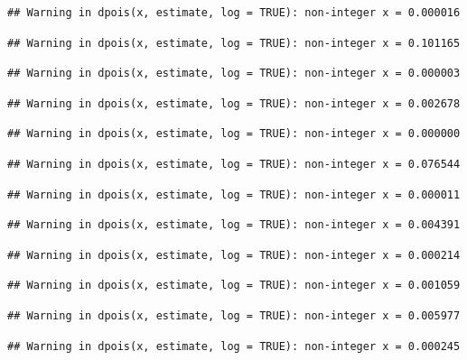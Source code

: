 \documentclass[]{article}
\begin{document}
\begin{verbatim}
## Warning in dpois(x, estimate, log = TRUE): non-integer x = 0.000016
\end{verbatim}

\begin{verbatim}
## Warning in dpois(x, estimate, log = TRUE): non-integer x = 0.101165
\end{verbatim}

\begin{verbatim}
## Warning in dpois(x, estimate, log = TRUE): non-integer x = 0.000003
\end{verbatim}

\begin{verbatim}
## Warning in dpois(x, estimate, log = TRUE): non-integer x = 0.002678
\end{verbatim}

\begin{verbatim}
## Warning in dpois(x, estimate, log = TRUE): non-integer x = 0.000000
\end{verbatim}

\begin{verbatim}
## Warning in dpois(x, estimate, log = TRUE): non-integer x = 0.076544
\end{verbatim}

\begin{verbatim}
## Warning in dpois(x, estimate, log = TRUE): non-integer x = 0.000011
\end{verbatim}

\begin{verbatim}
## Warning in dpois(x, estimate, log = TRUE): non-integer x = 0.004391
\end{verbatim}

\begin{verbatim}
## Warning in dpois(x, estimate, log = TRUE): non-integer x = 0.000214
\end{verbatim}

\begin{verbatim}
## Warning in dpois(x, estimate, log = TRUE): non-integer x = 0.001059
\end{verbatim}

\begin{verbatim}
## Warning in dpois(x, estimate, log = TRUE): non-integer x = 0.005977
\end{verbatim}

\begin{verbatim}
## Warning in dpois(x, estimate, log = TRUE): non-integer x = 0.000245
\end{verbatim}
\end{document}
